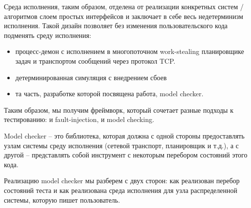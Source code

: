 Среда исполнения, таким образом, отделена от реализации конкретных систем / алгоритмов слоем простых интерфейсов и заключает в себе весь недетерминизм исполнения. Такой дизайн позволяет без изменения пользовательского кода подменять среду исполнения:
\begin{itemize}
    \item процесс-демон с исполнением в многопоточном work-stealing планировщике задач и транспортом сообщений через протокол TCP.
    \item детерминированная симуляция с внедрением сбоев
    \item та часть, разработке которой посвящена работа, model checker.
\end{itemize}

Таким образом, мы получим фреймворк, который сочетает разные подходы к тестированию: и fault-injection, и model checking.

Model checker – это библиотека, которая должна с одной стороны предоставлять узлам системы среду исполнения (сетевой транспорт, планировщик и т.д.), а с другой – представлять собой инструмент с некоторым перебором состояний этого кода.

Реализацию model checker мы разберем с двух сторон: как реализован перебор состояний теста и как реализована среда исполнения для узла распределенной системы, которую пишет пользователь. 
